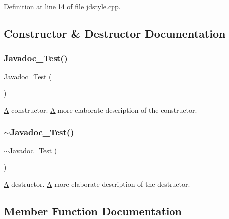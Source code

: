 Definition at line 14 of file jdstyle.\+cpp.



\subsection{Constructor \& Destructor Documentation}
\mbox{\label{class_javadoc___test_a7adb1076a9f698a2aa8a5ac0879f34ff}} 
\subsubsection{\texorpdfstring{Javadoc\+\_\+\+Test()}{Javadoc\_Test()}}
{\footnotesize\ttfamily \hyperlink{class_javadoc___test}{Javadoc\+\_\+\+Test} (\begin{DoxyParamCaption}{ }\end{DoxyParamCaption})}

\hyperlink{class_a}{A} constructor. \hyperlink{class_a}{A} more elaborate description of the constructor. \mbox{\label{class_javadoc___test_abda4d40f58e25104c7087e435fb0ddd0}} 
\subsubsection{\texorpdfstring{$\sim$\+Javadoc\+\_\+\+Test()}{~Javadoc\_Test()}}
{\footnotesize\ttfamily $\sim$\hyperlink{class_javadoc___test}{Javadoc\+\_\+\+Test} (\begin{DoxyParamCaption}{ }\end{DoxyParamCaption})}

\hyperlink{class_a}{A} destructor. \hyperlink{class_a}{A} more elaborate description of the destructor. 

\subsection{Member Function Documentation}
\mbox{\label{class_javadoc___test_af1299ea1b7efeb1548c7aba201ebe756}} 
